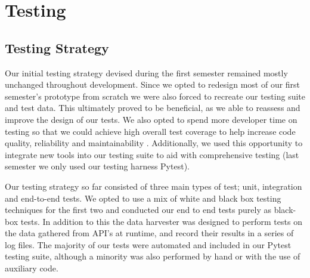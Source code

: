 \documentclass[main.tex]{subfiles}
\begin{document}
\section{Testing}
\label{Testing}

\subsection{Testing Strategy}

Our initial testing strategy devised during the first semester remained mostly unchanged throughout development. Since we opted to redesign most of our first semester’s prototype from scratch we were also forced to recreate our testing suite and test data. This ultimately proved to be beneficial, as we able to reassess and improve the design of our tests. We also opted to spend more developer time on testing so that we could achieve high overall test coverage to help increase code quality, reliability and maintainability \cite{coverageGood}. Additionally, we used this opportunity to integrate new tools into our testing suite to aid with comprehensive testing (last semester we only used our testing harness Pytest\cite{pytest}).

Our testing strategy so far consisted of three main types of test; unit, integration and end-to-end tests. We opted to use a mix of white and black box testing techniques for the first two and conducted our end to end tests purely as black-box tests. In addition to this the data harvester was designed to perform tests on the data gathered from API's at runtime, and record their results in a series of log files. The majority of our tests were automated and included in our Pytest testing suite, although a minority was also performed by hand or with the use of auxiliary code.
\end{document}
